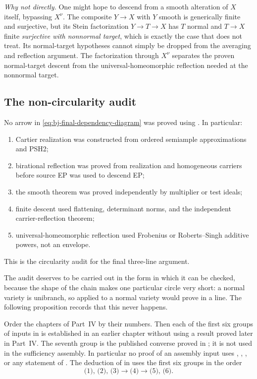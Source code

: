 \emph{Why not directly.}  One might hope to descend from a smooth alteration
of $X$ itself, bypassing $X^\nu$.  The composite $Y\to X$ with $Y$
smooth is generically finite and surjective, but its Stein factorization
$Y\to T\to X$ has $T$ normal and $T\to X$ finite \emph{surjective with
nonnormal target}, which is exactly the case that
 does not treat.  Its normal-target hypotheses
cannot simply be dropped from the averaging and reflection argument.  The
factorization through $X^\nu$ separates the proven normal-target descent
from the universal-homeomorphic reflection needed at the nonnormal target.

\subsection{The non-circularity audit}
\label{sec:ch45-noncircular}

No arrow in \eqref{eq:bj-final-dependency-diagram} was proved using
.
In particular:
\begin{enumerate}
\item Cartier realization was constructed from ordered semiample
      approximations and PSH2;
\item birational reflection was proved from realization and homogeneous
      carriers before source EP was used to descend EP;
\item the smooth theorem was proved independently by multiplier or test
      ideals;
\item finite descent used flattening, determinant norms, and the independent
      carrier-reflection theorem;
\item universal-homeomorphic reflection used Frobenius or Roberts--Singh
      additive powers, not an envelope.
\end{enumerate}
This is the circularity audit for the final three-line argument.

The audit deserves to be carried out in the form in which it can be checked,
because the shape of the chain makes one particular circle very short: a
normal variety is unibranch, so  applied to a
normal variety would prove  in a line.  The
following proposition records that this never happens.

\begin{proposition}
\label{prop:ch45-noncircular}
Order the chapters of Part~IV by their numbers.  Then each of the first six
groups of inputs in  is established in an earlier
chapter without using a result proved later in Part~IV.  The seventh group
is the published converse proved in ;
it is not used in the sufficiency assembly.
In particular no proof of an assembly input uses
, ,
, or any statement of
.  The deduction of
 in  uses the first six
groups in the order
\[
 \text{(1), (2), (3)}\to\text{(4)}\to\text{(5), (6)} .
\]
\end{proposition}


